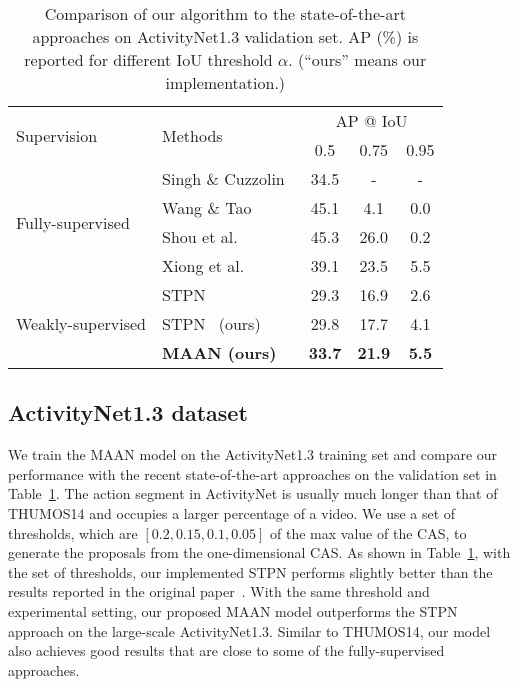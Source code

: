 \documentclass{article} \usepackage{iclr2019_conference,times}
\begin{document}
\begin{table}
\centering
\begin{footnotesize}
\caption{Comparison of our algorithm to the state-of-the-art approaches on ActivityNet1.3 validation set. AP (\%) is reported for different IoU threshold $\alpha$. (``ours'' means our implementation.) }
\label{tab:Anet_state_of_the_art}
\footnotesize
\begin{tabular}{llccc}
\toprule
\multirow{2}{*}{Supervision}       & \multirow{2}{*}{Methods} & \multicolumn{3}{c}{AP @ IoU} \\  
                                   &                          &  0.5     & 0.75      & 0.95   \\ \midrule
\multirow{4}{*}{Fully-supervised}  & Singh \& Cuzzolin~\citep{singh2016untrimmed}        & 34.5     & -        & -      \\
                                   & Wang \& Tao~\citep{Wang2016activitynet}              & 45.1     & 4.1      & 0.0    \\
                                   & Shou et al.~\citep{cdc}              & 45.3     & 26.0     & 0.2    \\
                                   & Xiong et al.~\citep{xiong2017pursuit}             & 39.1     & 23.5     & 5.5    \\ \midrule
\multirow{3}{*}{Weakly-supervised} & STPN~\citep{nguyen2017weakly}                     & 29.3     & 16.9     & 2.6    \\
                                   & STPN~\citep{nguyen2017weakly} (ours)             & 29.8    & 17.7    & 4.1   \\
                                   & \textbf{MAAN (ours)}                & \textbf{33.7}    & \textbf{21.9}    & \textbf{5.5}  \\ \bottomrule
\end{tabular}
\end{footnotesize}
\end{table}

\vspace{-1mm}

\subsection{ActivityNet1.3 dataset}
We train the MAAN model on the ActivityNet1.3 training set and compare our performance with the recent state-of-the-art approaches on the validation set in Table~\ref{tab:Anet_state_of_the_art}. The action segment in ActivityNet is usually much longer than that of THUMOS14 and occupies a larger percentage of a video. We use a set of thresholds, which are $ [0.2, 0.15, 0.1, 0.05] $ of the max value of the CAS, to generate the proposals from the one-dimensional CAS. As shown in Table~\ref{tab:Anet_state_of_the_art}, with the set of thresholds, our implemented STPN performs slightly better than the results reported in the original paper~\citep{nguyen2017weakly}. With the same threshold and experimental setting, our proposed MAAN model outperforms the STPN approach on the large-scale ActivityNet1.3. Similar to THUMOS14, our model also achieves good results that are close to some of the fully-supervised approaches.       
\end{document}
